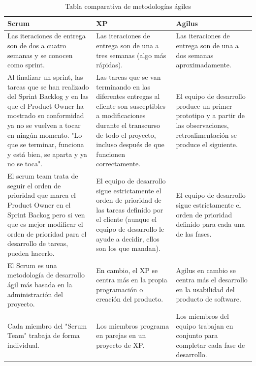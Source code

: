 \begin{table}[H]	
\begin{center}
\begin{tabular}{ | m{4cm} | m{4cm}| m{4cm}| } 
 \hline
 Scrum & XP & Agilus \\
 \hline
 Las iteraciones de entrega son de dos a cuatro semanas y se conocen como sprint. 
 &
 Las iteraciones de entrega son de una a tres semanas (algo más rápidas). 
 & 
 Las iteraciones de entrega son de una a dos semanas aproximadamente.\\
 \hline
 Al finalizar un sprint, las tareas que se han realizado del Sprint Backlog y en las que el Product Owner ha mostrado su conformidad ya no se vuelven a tocar en ningún momento. "Lo que se terminar, funciona y está bien, se aparta y ya no se toca".
 & 
 Las tareas que se van terminando en las diferentes entregas al cliente son susceptibles a modificaciones durante el transcurso de todo el proyecto, incluso después de que funcionen correctamente.
 & 
 El equipo de desarrollo produce un primer prototipo y a partir de las observaciones, retroalimentación se produce el siguiente.\\
 \hline
 El scrum team trata de seguir el orden de prioridad que marca el Product Owner en el Sprint Backog pero si ven que es mejor modificar el orden de prioridad para el desarrollo de tareas, pueden hacerlo.
 & 
 El equipo de desarrollo sigue estrictamente el orden de prioridad de las tareas definido por el cliente (aunque el equipo de desarrollo le ayude a decidir, ellos son los que mandan).
 & 
 El equipo de desarrollo sigue estrictamente el orden de prioridad definido para cada una de las fases.\\
 \hline
 El Scrum es una metodología de desarrollo ágil más basada en la administración del proyecto.
 & 
 En cambio, el XP se centra más en la propia programación o creación del producto.
 & 
 Agilus en cambio se centra más el desarrollo en la usabilidad del producto de software.\\
 \hline
 Cada miembro del "Scrum Team" trabaja de forma individual.
 & 
 Los miembros programa en parejas en un proyecto de XP.
 & 
 Los miembros del equipo trabajan en conjunto para completar cada fase de desarrollo.\\
 \hline
\end{tabular}
\caption{Tabla comparativa de metodologías ágiles}
\label{Tabla:2}
\end{center}
\end{table}	







